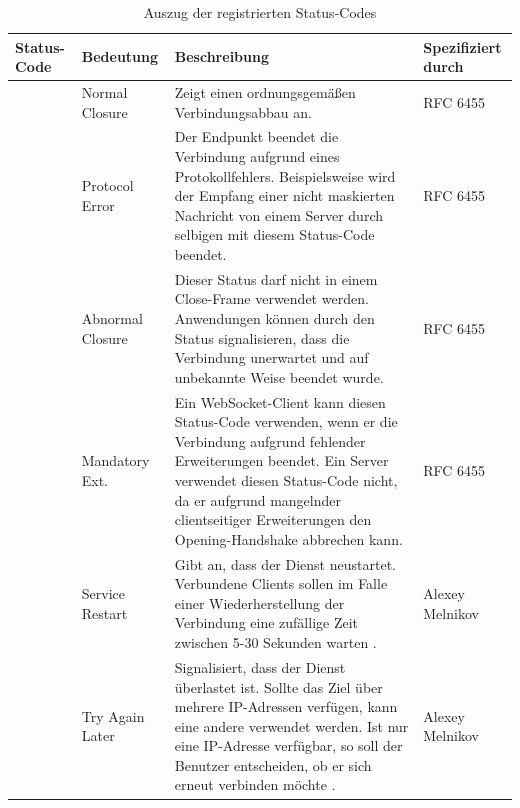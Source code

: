 \documentclass[11pt,a4paper,titlepage]{scrartcl}
\numberwithin{equation}{section}
\begin{document}
\begin{table}[ht]
	\begin{center}
		\begin{tabular}{|>{\centering\arraybackslash}p{1.2cm}|l|>{\arraybackslash}p{8.0cm}|l|}
			\hline
			Status-Code & Bedeutung &  Beschreibung & Spezifiziert durch \\ \hline
			1000 & Normal Closure & Zeigt einen ordnungsgemäßen Verbindungsabbau an. & RFC 6455  \\ \hline
			1002 & Protocol Error &  Der Endpunkt beendet die Verbindung aufgrund eines Protokollfehlers. Beispielsweise wird der Empfang einer nicht maskierten Nachricht von einem Server durch selbigen mit diesem Status-Code beendet. & RFC 6455 \\ \hline
			1006 & Abnormal Closure &  Dieser Status darf nicht in einem Close-Frame verwendet werden. Anwendungen können durch den Status signalisieren, dass die Verbindung unerwartet und auf unbekannte Weise beendet wurde.  & RFC 6455 \\ \hline
			1010 & Mandatory Ext. & Ein WebSocket-Client kann diesen Status-Code verwenden, wenn er die Verbindung aufgrund fehlender Erweiterungen beendet. Ein Server verwendet diesen Status-Code nicht, da er aufgrund mangelnder clientseitiger Erweiterungen den Opening-Handshake abbrechen kann. & RFC 6455 \\ \hline
			1012 & Service Restart & Gibt an, dass der Dienst neustartet. Verbundene Clients sollen im Falle einer Wiederherstellung der Verbindung eine zufällige Zeit zwischen 5-30 Sekunden warten \autocite{melnikov_additional_2012}. & Alexey Melnikov \\ \hline
			1013 & Try Again Later & Signalisiert, dass der Dienst überlastet ist. Sollte das Ziel über mehrere IP-Adressen verfügen, kann eine andere verwendet werden. Ist nur eine IP-Adresse verfügbar, so soll der Benutzer entscheiden, ob er sich erneut verbinden möchte \autocite{melnikov_additional_2012}. & Alexey Melnikov \\ \hline
		\end{tabular}
		\caption{Auszug der registrierten Status-Codes}\label{tbl:wsCloseCodes}
	\end{center}
\end{table}
\end{document}
